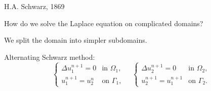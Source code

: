 \documentclass{beamer}
\begin{document}
\begin{frame}{H.A. Schwarz, 1869}

How do we solve the Laplace equation on complicated domains?

We split the domain into simpler subdomains.

\begin{figure}
	\centering
\end{figure}

Alternating Schwarz method:
\begin{equation*}
	\begin{cases} \Delta u_1^{n+1} = 0 & \text{in } \Omega_1, \\ u_1^{n+1} = u_2^n & \text{on } \Gamma_1, \end{cases}
	\quad
	\begin{cases} \Delta u_2^{n+1} = 0 & \text{in } \Omega_2, \\ u_2^{n+1} = u_1^{n+1} & \text{on } \Gamma_2. \end{cases}
\end{equation*}
\end{frame}
\end{document}
